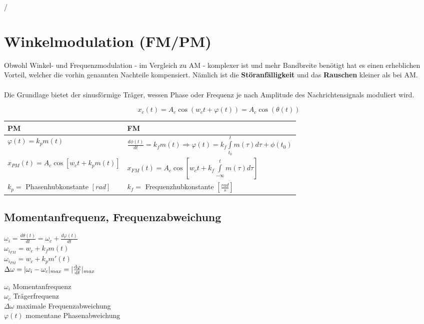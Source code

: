 /\section{Winkelmodulation (FM/PM) }
Obwohl Winkel- und Frequenzmodulation - im Vergleich zu AM - komplexer ist und mehr Bandbreite
benötigt hat es einen erheblichen Vorteil, welcher die vorhin genannten Nachteile kompensiert.
Nämlich ist die \textbf{Störanfälligkeit} und das \textbf{Rauschen} kleiner als bei AM. \\
\\
Die Grundlage bietet der sinusförmige Träger, wessen Phase oder Frequenz je nach Amplitude des 
Nachrichtensignals moduliert wird.

$$\boxed{ x_c(t) = A_c \cos(w_c t + \varphi(t)) = A_c \cos(\theta(t)) }$$

\begin{center}
\renewcommand{\arraystretch}{2}
\begin{tabular}{|p{8cm}|p{8cm}|}
	\hline
	\textbf{PM} &	\textbf{FM}\\
	\hline

	$\varphi(t) = k_p m(t)$ &
	$ \frac{d \phi(t)}{dt} = k_f m(t) \Rightarrow \varphi(t) = k_f \int\limits_{t_0}^{t} m(\tau)
	d\tau + \phi(t_0)$\\
	$x_{PM}(t) = A_c \cos[w_c t + k_p m(t)]$ &
	$x_{FM}(t) = A_c \cos[w_c t + k_f \int\limits_{- \infty}^{t} m(\tau)
	d\tau]$\\

	\hline
	$k_p=$ Phasenhubkonstante $[rad]$ & $k_f=$ Frequenzhubkonstante
	$[\frac{rad}{s}]$\\
	\hline
\end{tabular} 
\renewcommand{\arraystretch}{1}
\end{center}

\subsection{Momentanfrequenz, Frequenzabweichung}
\begin{multicols}{2}
	\begin{center}

		$ \omega_i = \frac{d \theta(t)}{dt} = \omega_c + \frac{d \varphi(t)}{dt} $\\
		$\omega_{i_{FM}} = w_c + k_f m(t)$\\
		$\omega_{i_{PM}} = w_c + k_p m'(t)$\\
		$ \Delta \omega = |\omega_i - \omega_c|_{max} = |\frac{\mathop{}\!\mathrm{d} \varphi}{\mathop{}\!\mathrm{d} t}|_{max}$ \\
	\end{center}
\columnbreak
		$\omega_i$ Momentanfrequenz \\
		$\omega_c$ Trägerfrequenz \\
		$\Delta \omega$ maximale Frequenzabweichung \\
		$\varphi(t)$ momentane Phasenabweichung \\
\end{multicols}

